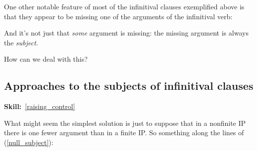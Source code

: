 \documentclass{article}
\begin{document}
One other notable feature of most of the infinitival clauses exemplified above is that they appear to be missing one of the arguments of the infinitival verb:
\begin{exe}
\end{exe}

And it's not just that \emph{some} argument is missing: the missing argument is always the \textit{subject}.

How can we deal with this?

    \subsection{Approaches to the subjects of infinitival clauses}
\hfill{}\textbf{Skill:}~\ref{raising_control}

What might seem the simplest solution is just to suppose that in a nonfinite IP there is one fewer argument than in a finite IP.
So something along the lines of (\ref{null_subject}): 
\begin{exe}
    \label{null_subject}
\end{exe}
\end{document}
